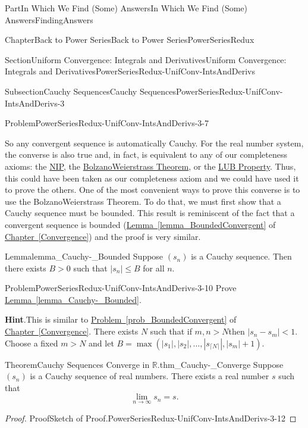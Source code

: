 \documentclass[oneside,10pt,]{book}
\newcommand{\blocktitlefont}{\relax}
\newcommand{\xreffont}{\relax}
\numberwithin{equation}{part}
\newcommand{\abs}[1]{\left|#1\right|}
\def\limit#1#2#3{{\displaystyle\lim_{#1\rightarrow #2}#3}}
\newcommand{\RR}{\mathbb {R}}
\newcommand{\lt}{<}
\begin{document}
\begin{partptx}{Part}{In Which We Find (Some) Answers}{}{In Which We Find (Some) Answers}{}{}{FindingAnswers}
\begin{chapterptx}{Chapter}{Back to Power Series}{}{Back to Power Series}{}{}{PowerSeriesRedux}
\begin{sectionptx}{Section}{Uniform Convergence: Integrals and Derivatives}{}{Uniform Convergence: Integrals and Derivatives}{}{}{PowerSeriesRedux-UnifConv-IntsAndDerivs}
\begin{subsectionptx}{Subsection}{Cauchy Sequences}{}{Cauchy Sequences}{}{}{PowerSeriesRedux-UnifConv-IntsAndDerivs-3}
\begin{problem}{Problem}{}{PowerSeriesRedux-UnifConv-IntsAndDerivs-3-7}
\end{problem}
So any convergent sequence is automatically Cauchy.  For the real number system, the converse is also true and, in fact, is equivalent to any of our completeness axioms: the \hyperref[NIP]{NIP}, the \hyperref[BolzanoWeierstrass]{Bolzano\textendash{}Weierstrass Theorem}, or the \hyperref[thm_LUB]{LUB Property}.  Thus, this could have been taken as our completeness axiom and we could have used it to prove the others.  One of the most convenient ways to prove this converse is to use the Bolzano\textendash{}Weierstrass Theorem.  To do that, we must first show that a Cauchy sequence must be bounded.  This result is reminiscent of the fact that a convergent sequence is bounded (\hyperref[lemma_BoundedConvergent]{Lemma~{\xreffont\ref{lemma_BoundedConvergent}}} of \hyperref[Convergence]{Chapter~{\xreffont\ref{Convergence}}}) and the proof is very similar.%
\begin{lemma}{Lemma}{}{}{lemma_Cauchy-_Bounded}%
Suppose \(\left(s_n\right)\) \(\)is a Cauchy sequence.  Then there exists \(B>0\) such that \(\abs{s_n}\leq B\) for all \(n\).%
\end{lemma}
\begin{problem}{Problem}{}{PowerSeriesRedux-UnifConv-IntsAndDerivs-3-10}%
Prove \hyperref[lemma_Cauchy-_Bounded]{Lemma~{\xreffont\ref{lemma_Cauchy-_Bounded}}}.%
\par\smallskip%
\noindent\textbf{\blocktitlefont Hint}.\hypertarget{PowerSeriesRedux-UnifConv-IntsAndDerivs-3-10-3}{}\quad{}This is similar to \hyperref[prob_BoundedConvergent]{Problem~{\xreffont\ref{prob_BoundedConvergent}}} of \hyperref[Convergence]{Chapter~{\xreffont\ref{Convergence}}}.  There exists \(N\) such that if \(m,n>N\)then \(|s_n-s_m|\lt
1\). Choose a fixed \(m>N\) and let \(B=\max\left(\abs{s_1}, \abs{s_2}, \ldots,
\abs{s_{\lceil N\rceil}}, \abs{s_m}+1\right)\).%
\end{problem}
\begin{theorem}{Theorem}{Cauchy Sequences Converge in \(\RR \).}{}{thm_Cauchy-_Converge}%
%
Suppose \(\left(s_n\right)\) is a Cauchy sequence of real numbers.  There exists a real number \(s\) such that%
\begin{equation*}
\limit{n}{\infty}{s_n}=s\text{.}
\end{equation*}
%
\end{theorem}
\begin{proof}{Proof}{Sketch of Proof.}{PowerSeriesRedux-UnifConv-IntsAndDerivs-3-12}

\end{proof}
\end{subsectionptx}
\end{sectionptx}
\end{chapterptx}
\end{partptx}
\end{document}
